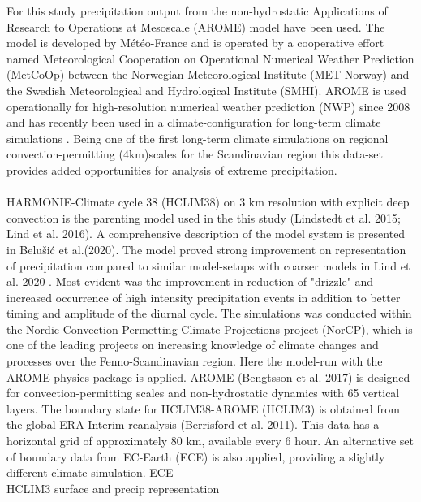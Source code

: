 For this study precipitation output from the non-hydrostatic Applications of Research to Operations at Mesoscale (AROME)\cite{seity_arome} model have been used. The model is developed by Météo-France and is operated by a cooperative effort named Meteorological Cooperation on Operational Numerical Weather Prediction (MetCoOp) between the Norwegian Meteorological Institute (MET-Norway) and the Swedish Meteorological and Hydrological Institute (SMHI). AROME is used operationally for high-resolution numerical weather prediction (NWP) since 2008 and has recently been used in a climate-configuration for long-term climate simulations \cite{lind_arome]}. Being one of the first long-term climate simulations on regional convection-permitting (\<4km)scales for the Scandinavian region this data-set provides added opportunities for analysis of extreme precipitation.  
\\
\\
HARMONIE-Climate cycle 38 (HCLIM38) on 3 km resolution with explicit deep convection is the parenting model used in the this study (Lindstedt et al. 2015\cite{lindstedt_hclim}; Lind et al. 2016\cite{lind_hclim}). A comprehensive description of the model system is presented in Belušić et al.(2020)\cite{belusic_hclim}. The model proved strong improvement on representation of precipitation compared to similar model-setups with coarser models in Lind et al. 2020 \cite{lind_arome}. Most evident was the improvement in reduction of "drizzle" and increased occurrence of high intensity precipitation events in addition to better timing and amplitude of the diurnal cycle. The simulations was conducted within the Nordic Convection Permetting Climate Projections project (NorCP), which is one of the leading projects on increasing knowledge of climate changes and processes over the Fenno-Scandinavian region. Here the model-run with the AROME physics package is applied. AROME (Bengtsson et al. 2017)\cite{bengtsson_arome} is designed for convection-permitting scales and non-hydrostatic dynamics with 65 vertical layers. The boundary state for HCLIM38-AROME (HCLIM3) is obtained from the global ERA-Interim reanalysis (Berrisford et al. 2011)\cite{erai}. This data has a horizontal grid of approximately 80 km, available every 6 hour. An alternative set of boundary data from EC-Earth (ECE) is also applied, providing a slightly different climate simulation.    
ECE
\\
HCLIM3
surface and precip representation

